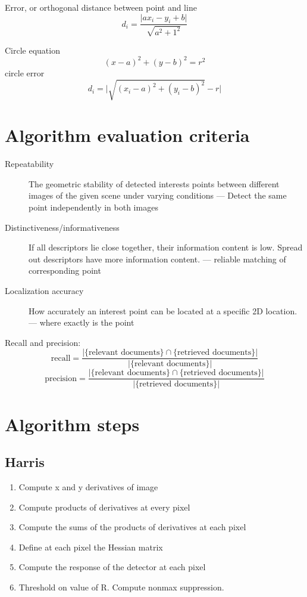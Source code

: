 Error, or orthogonal distance between point and line
\[
    d_i = \frac{\lvert ax_i -y_i + b \rvert}{\sqrt{a^2 + 1^2}}
\]

Circle equation
\[
    (x-a)^2 + (y-b)^2 = r^2
\]
circle error
\[
    d_i = \lvert\sqrt{(x_i-a)^2 + (y_i -b)^2}-r\rvert
\]

\section{Algorithm evaluation criteria}

\begin{description}
    \item [Repeatability]
        The geometric stability of detected interests points between different
        images of the given scene under varying conditions --- Detect the same
        point independently in both images
    \item [Distinctiveness/informativeness]
        If all descriptors lie close together, their information content is
        low. Spread out descriptors have more information content. --- reliable
        matching of corresponding point
    \item [Localization accuracy]
        How accurately an interest point can be located at a specific 2D
        location. --- where exactly is the point
\end{description}

Recall and precision:
\[
    \text{recall} = \frac{\lvert\text{\{relevant
    documents\}}\cap\text{\{retrieved documents\}}\rvert}
    {\lvert\text{\{relevant documents\}}\rvert}
\]
\[
    \text{precision} = \frac{\lvert\text{\{relevant
    documents\}}\cap\text{\{retrieved documents\}}\rvert}
    {\lvert\text{\{retrieved documents\}}\rvert}
\]

\section{Algorithm steps}

\subsection{Harris}
\begin{enumerate}
    \item Compute x and y derivatives of image
    \item Compute products of derivatives at every pixel
    \item Compute the sums of the products of derivatives at each pixel
    \item Define at each pixel the Hessian matrix
    \item Compute the response of the detector at each pixel
    \item Threshold on value of R. Compute nonmax suppression.
\end{enumerate}


